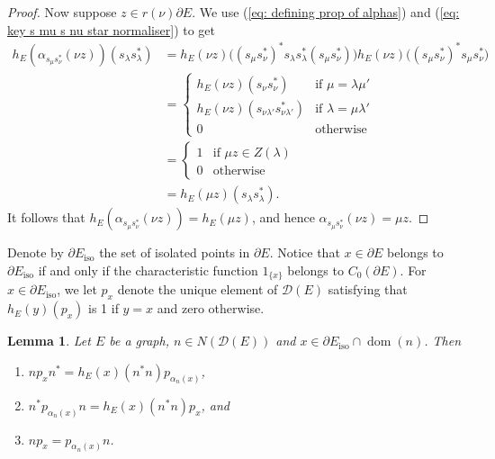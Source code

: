 \documentclass[12pt, a4paper]{amsart}
\numberwithin{equation}{section}
\newtheorem{lemma}[thm]{Lemma}
\theoremstyle{definition}
\theoremstyle{remark}
\begin{document}
\begin{proof}
Now suppose $z\in 
r(\nu)\partial E$. We use (\ref{eq: defining prop of alphas}) and (\ref{eq: 
key s mu s nu star normaliser}) to get
\begin{align*}
h_E(\alpha_{s_\mu s_\nu^*}(\nu z))(s_\lambda s_\lambda^*) &= h_E(\nu 
z)\big((s_\mu 
s_\nu^*)^*s_\lambda s_\lambda^*(s_\mu s_\nu ^*)\big)h_E(\nu z)\big((s_\mu 
s_{\nu}^*)^*s_\mu s_\nu^*\big)\\
&= 
\begin{cases}
h_E(\nu z)(s_\nu s_\nu^*) & \text{if $\mu=\lambda\mu'$}\\
h_E(\nu z)(s_{\nu\lambda'} s_{\nu\lambda'}^*) & \text{if 
$\lambda=\mu\lambda'$}\\
0 & \text{otherwise}
\end{cases}\\
&= 
\begin{cases}
1 & \text{if $\mu z\in Z(\lambda)$}\\
0 & \text{otherwise}
\end{cases}\\
&= h_E(\mu z)(s_\lambda s_\lambda^*).
\end{align*}
It follows that $h_E(\alpha_{s_\mu s_\nu^*}(\nu z))=h_E(\mu z)$, and hence 
$\alpha_{s_\mu s_\nu^*}(\nu z)=\mu z$.
\end{proof}

Denote by $\partial E_{{\operatorname{iso}}}$ the set of isolated points in $\partial E$. Notice 
that $x\in\partial E$ belongs to $\partial E_{{\operatorname{iso}}}$ if and only if the 
characteristic function $1_{\{x\}}$ belongs to $C_0(\partial E)$. For 
$x\in\partial E_{{\operatorname{iso}}}$, we let $p_x$ denote the unique element of 
$\mathcal{D}(E)$ satisfying that $h_E(y)(p_x)$ is 1 if $y=x$ and zero 
otherwise.

\begin{lemma}\label{lem: properties of alpha n}
Let $E$ be a graph, $n\in N({\mathcal{D}}(E))$ and $x\in\partial E_{{\operatorname{iso}}}\cap{{\operatorname{dom}}}(n)$. Then
\begin{enumerate}
\item[(a)] $np_xn^*=h_E(x)(n^*n)p_{\alpha_n(x)}$,
\item[(b)] $n^*p_{\alpha_n(x)}n=h_E(x)(n^*n)p_x$, and 
\item[(c)] $np_x=p_{\alpha_n(x)}n$.
\end{enumerate}
\end{lemma}
\end{document}
